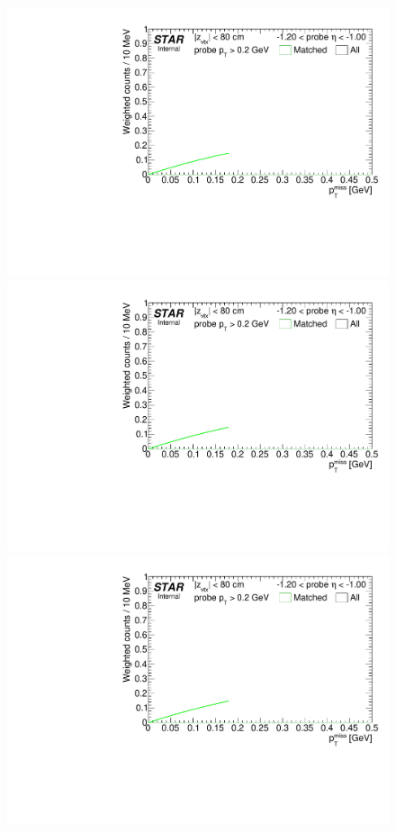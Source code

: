 \begin{figure}[ht]
{}~
\parbox{0.24\textwidth}{
  \centering
  \includegraphics[width=\linewidth,page=6]{graphics/correctionsToEff/TOF_tagAndProbe/Fitting_effVsEta_mc.CPT2.pdf}\\
  \includegraphics[width=\linewidth,page=8]{graphics/correctionsToEff/TOF_tagAndProbe/Fitting_effVsEta_mc.CPT2.pdf}\\
  \includegraphics[width=\linewidth,page=10]{graphics/correctionsToEff/TOF_tagAndProbe/Fitting_effVsEta_mc.CPT2.pdf}
}
\end{figure}
